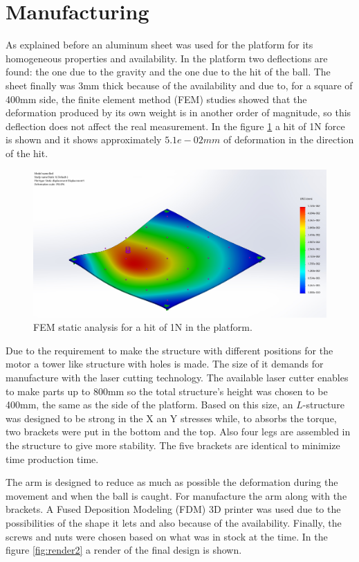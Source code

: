 	\section{Manufacturing} %
	\label{sec:mechanics_manufacturing}
		As explained before an aluminum sheet was used for the platform for its homogeneous properties and availability. 
		In the platform two deflections are found: the one due to the gravity and the one due to the hit of the ball. 
		The sheet finally was 3\si{mm} thick because of the availability and due to, for a square of 400\si{mm} side, the finite element method (FEM) studies showed that the deformation produced by its own weight is in another order of magnitude, so this deflection does not affect the real measurement. 
		In the figure \ref{fig:FEM} a hit of 1\si{N} force is shown and it shows approximately $5.1e-02\si{mm}$ of deformation in the direction of the hit.
		\begin{figure}[!ht]
			\begin{center}
				\includegraphics[width=.8\textwidth]{figures/FEM}
			\end{center}
			\caption{FEM static analysis for a hit of 1\si{N} in the platform.}
			\label{fig:FEM}
		\end{figure}
		Due to the requirement to make the structure with different positions for the motor a tower like structure with holes is made. The size of it demands for manufacture with the laser cutting technology. 
		The available laser cutter enables to make parts up to 800\si{mm} so the total structure's height was chosen to be 400\si{mm}, the same as the side of the platform. 
		Based on this size, an $L$-structure was designed to be strong in the X an Y stresses while, to absorbs the torque, two brackets were put in the bottom and the top.
		Also four legs are assembled in the structure to give more stability. The five brackets are identical to minimize time production time.
		
		The arm is designed to reduce as much as possible the deformation during the movement and when the ball is caught. For manufacture the arm along with the brackets. A Fused Deposition Modeling (FDM) 3D printer was used due to the possibilities of the shape it lets and also because of the availability. Finally, the screws and nuts were chosen based on what was in stock at the time. In the figure \ref{fig:render2} a render of the final design is shown.

